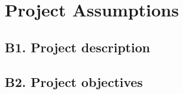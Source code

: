 \chapter*{\centering Project Assumptions}\label{ch:project-assumptions}


\section*{B1. Project description}\label{sec:project-description}



\section*{B2. Project objectives}\label{sec:project-objectives}
